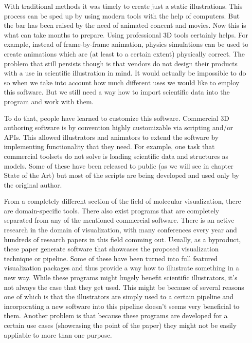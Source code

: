 \documentclass[
  digital, %
  table,   %
  nolof,     %
  nolot,     %
]{fithesis3}
\begin{document}
With traditional methods it was timely to create just a static illustrations. This process can be sped up by using modern tools with the help of computers. But the bar has been raised by the need of animated concent and movies. Now this is what can take months to prepare. Using professional 3D tools certainly helps. For example, instead of frame-by-frame animation, physics simulations can be used to create animations which are (at least to a certain extent) physically correct. The problem that still persists though is that vendors do not design their products with a use in scientific illustration in mind. It would actually be impossible to do so when we take into account how much different uses we would like to employ this software. But we still need a way how to import scientific data into the program and work with them.

To do that, people have learned to customize this software\cite{GrahamGaelInterview}. Commercial 3D authoring software is by convention highly customizable via scripting and/or APIs. This allowed illustrators and animators to extend the software by implementing functionality that they need. For example, one task that commercial toolsets do not solve is loading scientific data and structures as models. Some of these have been released to public (as we will see in chapter State of the Art) but most of the scripts are being developed and used only by the original author.

From a completely different section of the field of molecular visualization, there are domain-specific tools.
There also exist programs that are completely separated from any of the mentioned commercial software. There is an active research in the domain of visualization, with many conferences every year and hundreds of research papers in this field comming out. Usually, as a byproduct, these paper generate software that showcases the proposed visualization technique or pipeline. Some of these have been turned into full featured visualization packages and thus provide a way how to illustrate something in a new way. While these programs might hugely benefit scientific illustrators, it's not always the case that they get used. This might be because of several reasons one of which is that the illustrators are simply used to a certain pipeline and incorporating a new software into this pipeline doesn't seems very beneficial to them. Another problem is that because these programs are developed for a certain use cases (showcasing the point of the paper) they might not be easily appliable to more than one purpose.
\end{document}
